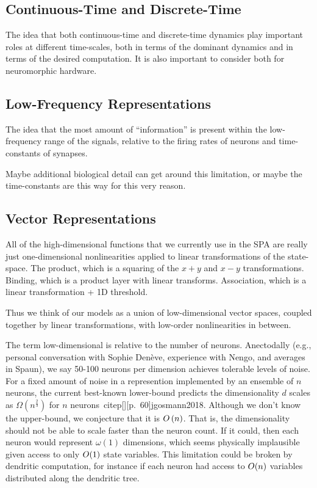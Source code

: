 \subsection{Continuous-Time and Discrete-Time}

The idea that both continuous-time and discrete-time dynamics play important roles at different time-scales, both in terms of the dominant dynamics and in terms of the desired computation.
It is also important to consider both for neuromorphic hardware.

\subsection{Low-Frequency Representations}

The idea that the most amount of ``information'' is present within the low-frequency range of the signals, relative to the firing rates of neurons and time-constants of synapses.

Maybe additional biological detail can get around this limitation, or maybe the time-constants are this way for this very reason.

\subsection{Vector Representations}

All of the high-dimensional functions that we currently use in the SPA are really just one-dimensional nonlinearities applied to linear transformations of the state-space.
The product, which is a squaring of the $x + y$ and $x - y$ transformations. Binding, which is a product layer with linear transforms. Association, which is a linear transformation + 1D threshold.

Thus we think of our models as a union of low-dimensional vector spaces, coupled together by linear transformations, with low-order nonlinearities in between.

The term low-dimensional is relative to the number of neurons.
Anectodally (e.g., personal conversation with Sophie Den\`eve, experience with Nengo, and averages in Spaun), we say 50-100 neurons per dimension achieves tolerable levels of noise.
For a fixed amount of noise in a represention implemented by an ensemble of $n$ neurons, the current best-known lower-bound predicts the dimensionality $d$ scales as $\Omega \left( n^{\frac{2}{3}} \right)$ for $n$ neurons~citep[][p.~60]{jgosmann2018}.
Although we don't know the upper-bound, we conjecture that it is $O \left( n \right)$.
That is, the dimensionality should not be able to scale faster than the neuron count.
If it could, then each neuron would represent $\omega(1)$ dimensions, which seems physically implausible given access to only $O (1)$ state variables.
This limitation could be broken by dendritic computation, for instance if each neuron had access to $O (n)$ variables distributed along the dendritic tree.


